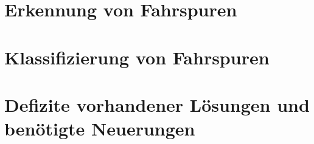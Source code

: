 \section{Erkennung von Fahrspuren}
\label{sec:rw_lane_detection}






\section{Klassifizierung von Fahrspuren}
\label{sec:rw_lane_classification}

\section{Defizite vorhandener Lösungen und benötigte Neuerungen}
\label{sec:rw_deficites}


